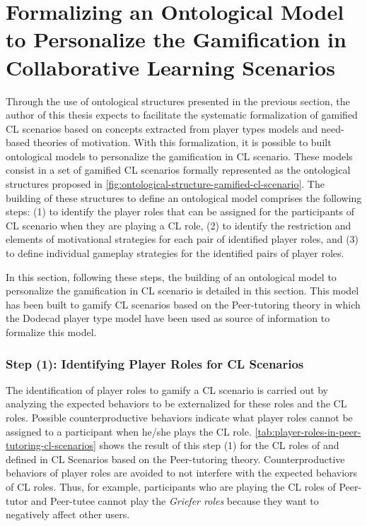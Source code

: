 
\section[Formalizing an Ontological Model to Personalize the Gamification in CL Scenarios]{Formalizing an Ontological Model to Personalize the Gamification in Collaborative Learning Scenarios}
\label{sec:formalizing-ontological-model}

Through the use of ontological structures presented in the previous section, the author of this thesis expects to facilitate the systematic formalization of gamified CL scenarios based on concepts extracted from player types models and need-based theories of motivation. With this formalization, it is possible to built ontological models to personalize the gamification in CL scenario. These models consist in a set of gamified CL scenarios formally represented as the ontological structures proposed in \autoref{fig:ontological-structure-gamified-cl-scenario}. The building of these structures to define an ontological model comprises the following steps: (1) to identify the player roles that can be assigned for the participants of CL scenario when they are playing a CL role, (2) to identify the restriction and elements of motivational strategies for each pair of identified player roles, and (3) to define individual gameplay strategies for the identified pairs of player roles.

In this section, following these steps, the building of an ontological model to personalize the gamification in CL scenario is detailed in this section. This model has been built to gamify CL scenarios based on the Peer-tutoring theory \cite{Endlsey1980} in which the Dodecad player type model \cite{Marczewski2017,Marczewski2015b} have been used as source of information to formalize this model. 

\subsubsection*{Step (1): Identifying Player Roles for CL Scenarios}  

The identification of player roles to gamify a CL scenario is carried out by analyzing the expected behaviors to be externalized for these roles and the CL roles. Possible counterproductive behaviors indicate what player roles cannot be assigned to a participant when he/she plays the CL role. \autoref{tab:player-roles-in-peer-tutoring-cl-scenarios} shows the result of this step (1) for the CL roles of  and  defined in CL Scenarios based on the Peer-tutoring theory. Counterproductive behaviors of player roles are avoided to not interfere with the expected behaviors of CL roles. Thus, for example, participants who are playing the CL roles of Peer-tutor and Peer-tutee cannot play the \emph{Griefer roles} because they want to negatively affect other users.

